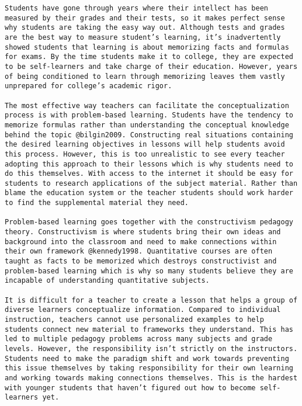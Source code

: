\documentclass[11pt,]{article}
\begin{document}
\begin{verbatim}
Students have gone through years where their intellect has been measured by their grades and their tests, so it makes perfect sense why students are taking the easy way out. Although tests and grades are the best way to measure student’s learning, it’s inadvertently showed students that learning is about memorizing facts and formulas for exams. By the time students make it to college, they are expected to be self-learners and take charge of their education. However, years of being conditioned to learn through memorizing leaves them vastly unprepared for college’s academic rigor.

The most effective way teachers can facilitate the conceptualization process is with problem-based learning. Students have the tendency to memorize formulas rather than understanding the conceptual knowledge behind the topic @bilgin2009. Constructing real situations containing the desired learning objectives in lessons will help students avoid this process. However, this is too unrealistic to see every teacher adopting this approach to their lessons which is why students need to do this themselves. With access to the internet it should be easy for students to research applications of the subject material. Rather than blame the education system or the teacher students should work harder to find the supplemental material they need.

Problem-based learning goes together with the constructivism pedagogy theory. Constructivism is where students bring their own ideas and background into the classroom and need to make connections within their own framework @kennedy1998. Quantitative courses are often taught as facts to be memorized which destroys constructivist and problem-based learning which is why so many students believe they are incapable of understanding quantitative subjects.

It is difficult for a teacher to create a lesson that helps a group of diverse learners conceptualize information. Compared to individual instruction, teachers cannot use personalized examples to help students connect new material to frameworks they understand. This has led to multiple pedagogy problems across many subjects and grade levels. However, the responsibility isn’t strictly on the instructors. Students need to make the paradigm shift and work towards preventing this issue themselves by taking responsibility for their own learning and working towards making connections themselves. This is the hardest with younger students that haven’t figured out how to become self-learners yet. 


\end{verbatim}
\end{document}
